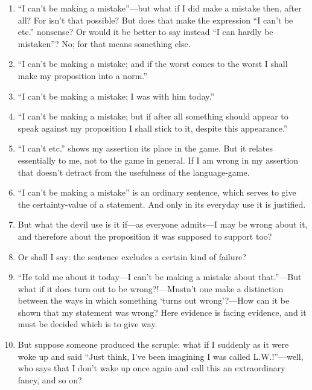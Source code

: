 \documentclass{book}
\begin{document}
\begin{enumerate}
\item
``I can't be making a mistake''---but what if I did make a mistake then, after
all? For isn't that possible? But does that make the expression ``I can't be
etc.'' nonsense? Or would it be better to say instead ``I can hardly be
mistaken''? No; for that means something else.

\item
``I can't be making a mistake; and if the worst comes to the worst I shall make
my proposition into a norm.''

\item
``I can't be making a mistake; I was with him today.''

\item
``I can't be making a mistake; but if after all something should appear to
speak against my proposition I shall stick to it, despite this appearance.''

\item
``I can't etc.'' shows my assertion its place in the game. But it relates
essentially to me, not to the game in general.  If I am wrong in my assertion
that doesn't detract from the usefulness of the language-game.

\item
``I can't be making a mistake'' is an ordinary sentence, which serves to give
the certainty-value of a statement. And only in its everyday use it is
justified.

\item
But what the devil use is it if---as everyone admits---I may be wrong about it,
and therefore about the proposition it was supposed to support too?

\item
Or shall I say: the sentence excludes a certain kind of failure?

\item
``He told me about it today---I can't be making a mistake about that.''---But
what if it does turn out to be wrong?!---Mustn't one make a distinction between
the ways in which something `turns out wrong'?---How can it be shown that my
statement was wrong? Here evidence is facing evidence, and it must be decided
which is to give way.

\item
But suppose someone produced the scruple: what if I suddenly as it were woke up
and said ``Just think, I've been imagining I was called L.W.!''---well, who
says that I don't wake up once again and call this an extraordinary fancy, and
so on?


\end{enumerate}
\end{document}
